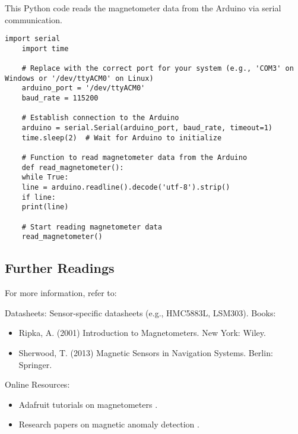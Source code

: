 \newpage

This Python code reads the magnetometer data from the Arduino via serial communication.

\begin{lstlisting}[style=pythonstyle, caption={Python Code to Read Magnetometer Data via Serial}, label={lst:python_magnetometer}]
	import serial
	import time
	
	# Replace with the correct port for your system (e.g., 'COM3' on Windows or '/dev/ttyACM0' on Linux)
	arduino_port = '/dev/ttyACM0'  
	baud_rate = 115200
	
	# Establish connection to the Arduino
	arduino = serial.Serial(arduino_port, baud_rate, timeout=1)
	time.sleep(2)  # Wait for Arduino to initialize
	
	# Function to read magnetometer data from the Arduino
	def read_magnetometer():
	while True:
	line = arduino.readline().decode('utf-8').strip()
	if line:
	print(line)
	
	# Start reading magnetometer data
	read_magnetometer()
\end{lstlisting}

\subsection{Further Readings}
For more information, refer to:

Datasheets: Sensor-specific datasheets (e.g., HMC5883L, LSM303).
Books:
\begin{itemize}
	\item Ripka, A. (2001) Introduction to Magnetometers. New York: Wiley.
	\item Sherwood, T. (2013) Magnetic Sensors in Navigation Systems. Berlin: Springer.
\end{itemize}
Online Resources:
\begin{itemize}
	\item Adafruit tutorials on magnetometers \cite{Adafruit:2021a}.
	\item Research papers on magnetic anomaly detection \cite{Hansen:2017}.
\end{itemize}








